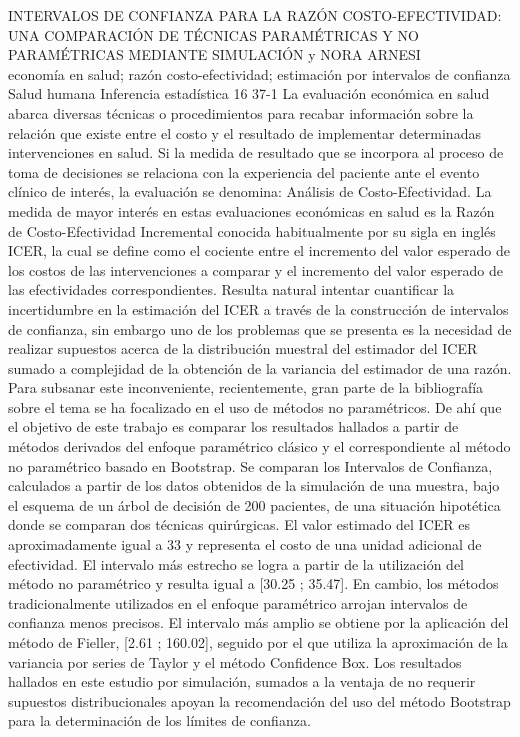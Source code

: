 \A
{INTERVALOS DE CONFIANZA PARA LA RAZÓN COSTO-EFECTIVIDAD: UNA COMPARACIÓN DE TÉCNICAS PARAMÉTRICAS Y NO PARAMÉTRICAS MEDIANTE SIMULACIÓN}
{ y NORA ARNESI}
{
\\}
{economía en salud; razón costo-efectividad; estimación por intervalos de confianza} 
 {Salud humana} 
 {Inferencia estadística} 
 {16} 
 {37-1}
{La evaluación económica en salud abarca diversas técnicas o procedimientos para recabar información sobre la relación que existe entre el costo y el resultado de implementar determinadas intervenciones en salud. Si la medida de resultado que se incorpora al proceso de toma de decisiones se relaciona con la experiencia del paciente ante el evento clínico de interés, la evaluación se denomina: Análisis de Costo-Efectividad. La medida de mayor interés en estas evaluaciones económicas en salud es la Razón de Costo-Efectividad Incremental conocida habitualmente por su sigla en inglés ICER, la cual se define como el cociente entre el incremento del valor esperado de los costos de las intervenciones a comparar y el incremento del valor esperado de las efectividades correspondientes. Resulta natural intentar cuantificar la incertidumbre en la estimación del ICER a través de la construcción de intervalos de confianza, sin embargo uno de los problemas que se presenta es la necesidad de realizar supuestos acerca de la distribución muestral del estimador del ICER sumado a complejidad de la obtención de la variancia del estimador de una razón. Para subsanar este inconveniente, recientemente, gran parte de la bibliografía sobre el tema se ha focalizado en el uso de métodos no paramétricos. De ahí que el objetivo de este trabajo es comparar los resultados hallados a partir de métodos derivados del enfoque paramétrico clásico y el correspondiente al método no paramétrico basado en Bootstrap. Se comparan los Intervalos de Confianza, calculados a partir de los datos obtenidos de la simulación de una muestra, bajo el esquema de un árbol de decisión de 200 pacientes, de una situación hipotética donde se comparan dos técnicas quirúrgicas. El valor estimado del ICER es aproximadamente igual a 33 y representa el costo de una unidad adicional de efectividad. El intervalo más estrecho se logra a partir de la utilización del método no paramétrico y resulta igual a [30.25 ; 35.47]. En cambio, los métodos tradicionalmente utilizados en el enfoque paramétrico arrojan intervalos de confianza menos precisos. El intervalo más amplio se obtiene por la aplicación del método de Fieller, [2.61 ; 160.02], seguido por el que utiliza la aproximación de la variancia por series de Taylor y el método Confidence Box. Los resultados hallados en este estudio por simulación, sumados a la ventaja de no requerir supuestos distribucionales apoyan la recomendación del uso del método Bootstrap para la determinación de los límites de confianza. }
